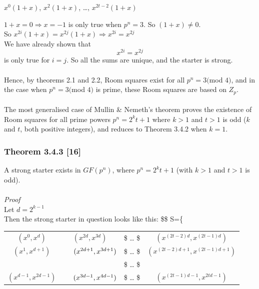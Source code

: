 \documentclass[
  12pt,
  a4paper]{book}
\begin{document}
\(x^0(1+x)\), \(x^2(1+x)\), \ldots, \(x^{2t-2}(1+x)\)

\(1+x=0 \Rightarrow x = -1\) is only true when \(p^n=3\). So
\((1+x) \neq 0\).\\
So \(x^{2i}(1+x)=x^{2j}(1+x) \Rightarrow x^{2i}=x^{2j}\)\\
We have already shown that \[x^{2i}=x^{2j}\] is only true for \(i=j\). So
all the sums are unique, and the starter is strong.\\
~\\
Hence, by theorems 2.1 and 2.2, Room squares exist for all \(p^n=3(\)mod
\(4)\), and in the case when \(p^n=3(\)mod \(4)\) is prime, these Room squares
are based on \(Z_p\).\\
~\\
The most generalised case of Mullin \& Nemeth's theorem proves the
existence of Room squares for all prime powers \(p^n=2^kt+1\) where \(k>1\)
and \(t>1\) is odd (\(k\) and \(t\), both positive integers), and reduces to
Theorem 3.4.2 when \(k=1\).

\hypertarget{theorem-3.4.3-16}{%
\subsubsection{Theorem 3.4.3 {[}16{]}}\label{theorem-3.4.3-16}}

A strong starter exists in \(GF(p^n)\), where \(p^n=2^kt+1\) (with \(k>1\) and
\(t>1\) is odd).\\
~\\
\emph{Proof}\\
Let \(d=2^{k-1}\)\\
Then the strong starter in question looks like this: \$\$ S=\{

\begin{longtable}[]{@{}cccc@{}}
\toprule
\endhead
\((x^0,x^d)\) & \((x^{2d},x^{3d})\) & \$ \hspace{0.5cm} \ldots{} \hspace{0.5cm} \$ & \((x^{(2t-2)d},x^{(2t-1)d})\)\tabularnewline
\((x^1,x^{d+1})\) & \(\hspace{0.5cm}(x^{2d+1},x^{3d+1})\) & \$ \hspace{0.5cm} \ldots{} \hspace{0.5cm} \$ & \((x^{(2t-2)d+1},x^{(2t-1)d+1})\)\tabularnewline
& & \$ \hspace{0.5cm} \ldots{} \hspace{0.5cm} \$ &\tabularnewline
\((x^{d-1},x^{2d-1})\) & \(\hspace{0.5cm}(x^{3d-1},x^{4d-1})\) & \$ \hspace{0.5cm} \ldots{} \hspace{0.5cm} \$ & \((x^{(2t-1)d-1},x^{2td-1})\)\tabularnewline
\bottomrule
\end{longtable}
\end{document}
